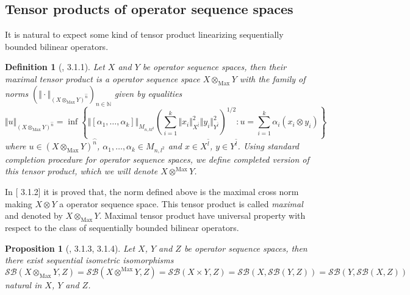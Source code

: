 \documentclass[12pt]{article}
\newtheorem{proposition}[theorem]{Proposition}
\newtheorem{definition}[theorem]{Definition}
\begin{document}
\subsection{Tensor products of operator sequence spaces}

It is natural to expect some kind of tensor product linearizing 
sequentially bounded bilinear operators.
\begin{definition}[\cite{LamOpFolgen}, 3.1.1]\label{DefSQMaxTenProd}
Let $X$ and $Y$ be operator sequence spaces, then their maximal tensor 
product is a operator sequence space $X\otimes_{\mathrm{Max}}Y$ with the 
family of norms 
${(
    \Vert\cdot\Vert_{{(X\otimes_{\mathrm{Max}}Y)}^{\wideparen{n}}}
)}_{n\in\mathbb{N}}$ 
given by equalities
$$
\Vert u\Vert_{{(X\otimes_{\mathrm{Max}}Y)}^{\wideparen{n}}}
=\inf\left \{
    \Vert[\alpha_1,\ldots,\alpha_k]\Vert_{M_{n,kl^2}}
    {\left(
        \sum\limits_{i=1}^k
            \Vert x_i\Vert_{X^{\wideparen{l}}}^2
            \Vert y_i\Vert_{Y^{\wideparen{l}}}^2
    \right)}^{1/2}
    :u=\sum\limits_{i=1}^k\alpha_i(x_i\otimes y_i)
\right \}
$$
where $u\in {(X\otimes_{\mathrm{Max}}Y)}^{\wideparen{n}}$, 
$\alpha_1,\ldots,\alpha_k\in M_{n,l^2}$ and $x\in X^{\wideparen{l}}$, 
$y\in Y^{\wideparen{l}}$. Using standard completion procedure for operator 
sequence spaces, we define completed version of this tensor product, which 
we will denote $X\otimes^{\mathrm{Max}} Y$.
\end{definition}

In [\cite{LamOpFolgen} 3.1.2] it is proved that, the norm defined above is 
the maximal cross norm making $X\otimes Y$ a operator sequence space. This 
tensor product is called \textit{maximal} and denoted by 
$X \otimes_{\mathrm{Max}} Y$. Maximal tensor product have universal property 
with respect to the class of  sequentially bounded bilinear operators.

\begin{proposition}[\cite{LamOpFolgen}, 
    3.1.3, 3.1.4]\label{PrSQUnivPropMaxTenProd}
Let $X$, $Y$ and $Z$ be operator sequence spaces, then there exist 
sequential isometric isomorphisms 
$$
\mathcal{SB}(X\otimes_{\mathrm{Max}}Y, Z)
=\mathcal{SB}(X\otimes^{\mathrm{Max}}Y, Z) 
=\mathcal{SB}(X\times Y, Z)
=\mathcal{SB}(X,\mathcal{SB}(Y,Z)) 
=\mathcal{SB}(Y,\mathcal{SB}(X,Z))
$$
natural in $X$, $Y$ and $Z$.
\end{proposition}
\end{document}
